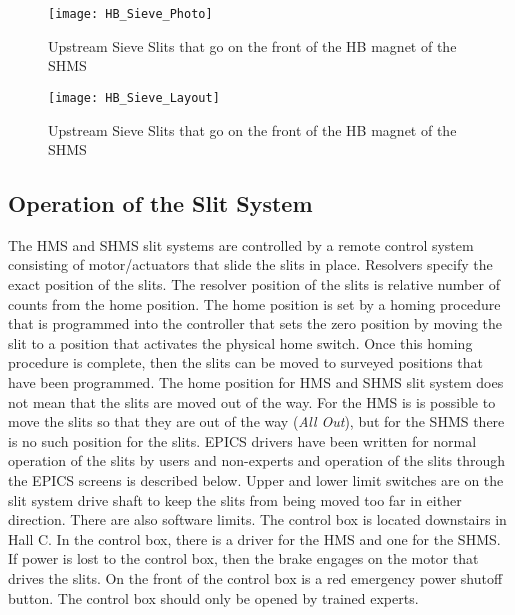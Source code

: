\begin{figure}
\texttt{[image: HB\_Sieve\_Photo]}
\caption{Upstream Sieve Slits that go on the front of the HB magnet of the SHMS \label{fig:HB_Sieve_Photo}}
\end{figure}

\begin{figure}
\texttt{[image: HB\_Sieve\_Layout]}
\caption{Upstream Sieve Slits that go on the front of the HB magnet of the SHMS \label{fig:HB_Sieve_Layout}}
\end{figure}

\subsection{Operation of the Slit System}\label{sssec:slit_control}
The HMS and SHMS slit systems are controlled by a remote control system consisting of
motor/actuators that slide the slits in place. Resolvers specify the exact position of the slits.
The resolver position of the slits is relative number of counts from the home position. The home position
is set by a homing procedure that is programmed into the controller that sets the zero position by moving the
slit to a position that activates the physical home switch. Once this homing procedure is complete, then
the slits can be moved to surveyed positions that have been programmed. The home position for HMS and SHMS slit system
does not mean that the slits are moved out of the way. For the HMS is is possible to move the slits so that
they are out of the way ({\it All Out}), but for the SHMS there is no such position for the slits.
EPICS drivers have been written for
normal operation of the slits by users and non-experts and operation of the slits through the EPICS
screens is described below. Upper and lower limit switches are on the slit system drive shaft to keep the
slits from being moved too far in either direction. There are also software limits.
The control box is located downstairs in Hall C. In the control box, there is a driver
for the HMS and one for the SHMS. If power is lost to the control box, then the brake engages
on the motor that drives the slits. On the front of the control box is
a red  emergency power shutoff button. The control box should only be opened by trained experts.

